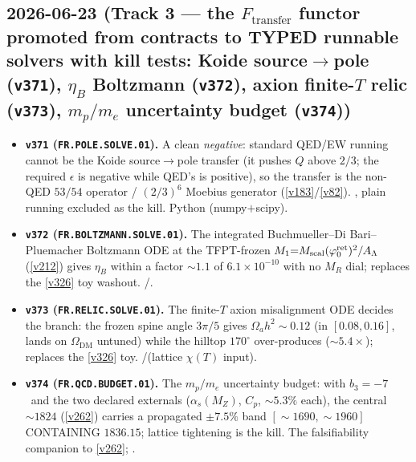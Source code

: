 \subsection*{2026-06-23 (Track 3 --- the $F_{\mathrm{transfer}}$ functor promoted from contracts to TYPED runnable solvers with kill tests: Koide source$\to$pole (\texttt{v371}), $\eta_B$ Boltzmann (\texttt{v372}), axion finite-$T$ relic (\texttt{v373}), $m_p/m_e$ uncertainty budget (\texttt{v374}))}
\begin{itemize}
\item \textbf{\texttt{v371} (\texttt{FR.POLE.SOLVE.01}).} A clean \emph{negative}: standard QED/EW running cannot
be the Koide source$\to$pole transfer (it pushes $Q$ above $2/3$; the required $\epsilon$ is negative while
QED's is positive), so the transfer is the non-QED $53/54$ operator / $(2/3)^6$ Moebius generator
(\vref{v183}/\vref{v82}). \mC, plain running excluded as the kill. Python (numpy$+$scipy).
\item \textbf{\texttt{v372} (\texttt{FR.BOLTZMANN.SOLVE.01}).} The integrated Buchmueller--Di Bari--Pluemacher
Boltzmann ODE at the TFPT-frozen $M_1{=}M_{\mathrm{scal}}(\varphi_0^{\mathrm{ret}})^2/A_\Lambda$ (\vref{v212}) gives $\eta_B$ within a
factor ${\sim}1.1$ of $6.1{\times}10^{-10}$ with no $M_R$ dial; replaces the \vref{v326} toy washout. \mC/\mX.
\item \textbf{\texttt{v373} (\texttt{FR.RELIC.SOLVE.01}).} The finite-$T$ axion misalignment ODE decides the
branch: the frozen spine angle $3\pi/5$ gives $\Omega_a h^2{\sim}0.12$ (in $[0.08,0.16]$, lands on
$\Omega_{\mathrm{DM}}$ untuned) while the hilltop $170^\circ$ over-produces (${\sim}5.4\times$); replaces the
\vref{v326} toy. \mC/\mX (lattice $\chi(T)$ input).
\item \textbf{\texttt{v374} (\texttt{FR.QCD.BUDGET.01}).} The $m_p/m_e$ uncertainty budget: with $b_3{=}-7$
\mE\ and the two declared externals ($\alpha_s(M_Z)$, $C_p$, ${\sim}5.3\%$ each), the central ${\sim}1824$
(\vref{v262}) carries a propagated ${\pm}7.5\%$ band $[\sim1690,\sim1960]$ CONTAINING $1836.15$; lattice
tightening is the kill. The falsifiability companion to \vref{v262}; \mC.
\end{itemize}

